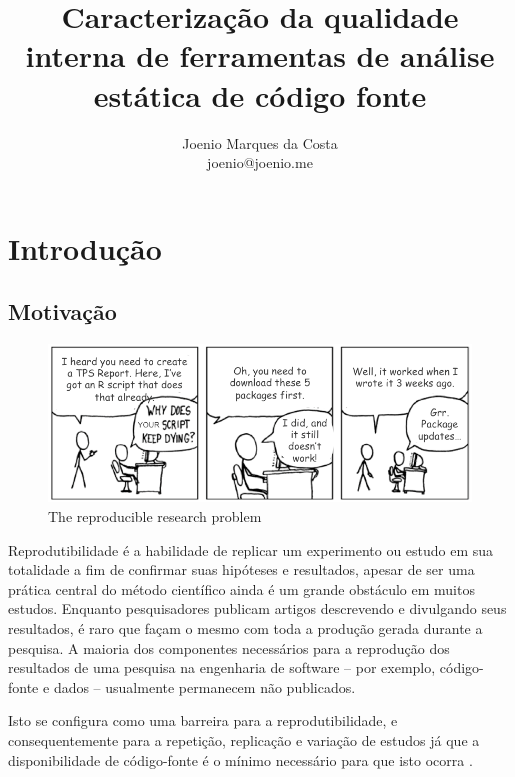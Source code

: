\documentclass[qual, classic, a4paper]{ufbathesis}
\title{
  Caracterização da qualidade interna de ferramentas de análise estática de
  código fonte
}
\author{Joenio Marques da Costa\\
  {\small joenio@joenio.me}
}
\begin{document}
\frontpage
\frontmatter
\presentationpage

%
%
%
%

\tableofcontents
\listoffigures
\listoftables
\mainmatter

\chapter{Introdução}

\section{Motivação}

\begin{figure}[h]
  \center
  \includegraphics[scale=0.5]{imagens/reproducible-r-toolkit-cartoon.png}
  \caption{The reproducible research problem\cite{RevolutionanalyticsComRRT}}
  \label{reproducible-r-toolkit-cartoon}
\end{figure}

Reprodutibilidade é a habilidade de replicar um experimento ou estudo em sua
totalidade a fim de confirmar suas hipóteses e resultados, apesar de ser uma
prática central do método científico ainda é um grande obstáculo em muitos
estudos. Enquanto pesquisadores publicam artigos descrevendo e divulgando seus
resultados, é raro que façam o mesmo com toda a produção gerada durante a
pesquisa. A maioria dos componentes necessários para a reprodução dos
resultados de uma pesquisa na engenharia de software -- por exemplo,
código-fonte e dados -- usualmente permanecem não publicados.

Isto se configura como uma barreira para a reprodutibilidade, e
consequentemente para a repetição, replicação e variação de estudos
\cite{Feitelson2015} já que a disponibilidade de código-fonte é o mínimo
necessário para que isto ocorra \cite{Peng2011}.
\end{document}
